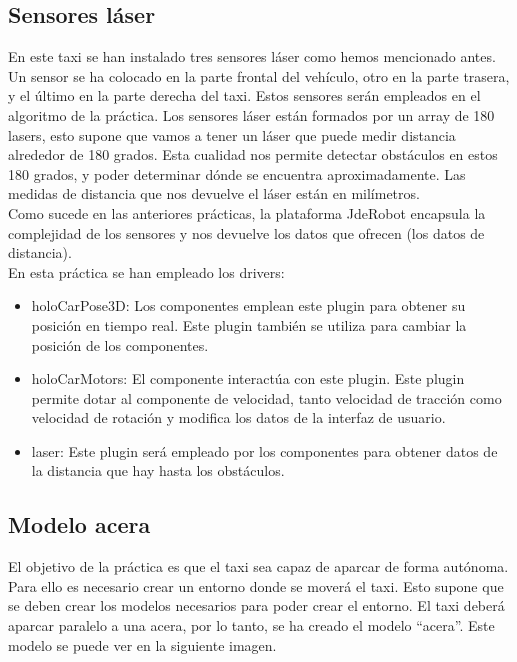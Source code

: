 \subsection{Sensores láser}
En este taxi se han instalado tres sensores láser como hemos mencionado antes. Un sensor se ha colocado en la parte frontal del vehículo, otro en la parte trasera, y el último en la parte derecha del taxi. Estos sensores serán empleados en el algoritmo de la práctica. Los sensores láser están formados por un array de 180 lasers, esto supone que vamos a tener un láser que puede medir distancia alrededor de 180 grados. Esta cualidad nos permite detectar obstáculos en estos 180 grados, y poder determinar dónde se encuentra aproximadamente. Las medidas de distancia que nos devuelve el láser están en milímetros. \\

Como sucede en las anteriores prácticas, la plataforma JdeRobot encapsula la complejidad de los sensores y nos devuelve los datos que ofrecen (los datos de distancia).\\

En esta práctica se han empleado los drivers:

\begin{itemize}
\item holoCarPose3D: Los componentes emplean este plugin para obtener su posición en tiempo real. Este plugin también se utiliza para cambiar la posición de los componentes.
\item	holoCarMotors: El componente interactúa con este plugin. Este plugin permite dotar al componente de velocidad, tanto velocidad de tracción como velocidad de rotación y modifica los datos de la interfaz de usuario.
\item	laser: Este plugin será empleado por los componentes para obtener datos de la distancia que hay hasta los obstáculos.
\end{itemize}

\subsection{Modelo acera} \label{sec.acera}
El objetivo de la práctica es que el taxi sea capaz de aparcar de forma autónoma. Para ello es necesario crear un entorno donde se moverá el taxi. Esto supone que se deben crear los modelos necesarios para poder crear el entorno. El taxi deberá aparcar paralelo a una acera, por lo tanto, se ha creado el modelo ``acera''. Este modelo se puede ver en la siguiente imagen.

